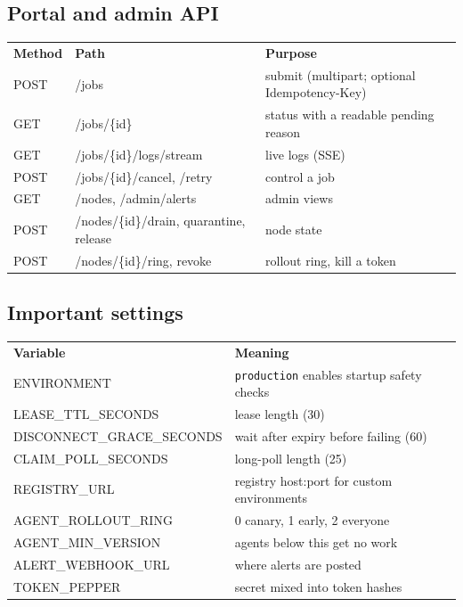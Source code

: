 \subsection{Portal and admin API}

\begin{center}
\begin{tabular}{lll}
\textbf{Method} & \textbf{Path} & \textbf{Purpose} \\
POST & /jobs & submit (multipart; optional Idempotency-Key) \\
GET & /jobs/\{id\} & status with a readable pending reason \\
GET & /jobs/\{id\}/logs/stream & live logs (SSE) \\
POST & /jobs/\{id\}/cancel, /retry & control a job \\
GET & /nodes, /admin/alerts & admin views \\
POST & /nodes/\{id\}/drain, quarantine, release & node state \\
POST & /nodes/\{id\}/ring, revoke & rollout ring, kill a token \\
\end{tabular}
\end{center}

\subsection{Important settings}

\begin{center}
\begin{tabular}{ll}
\textbf{Variable} & \textbf{Meaning} \\
ENVIRONMENT & \texttt{production} enables startup safety checks \\
LEASE\_TTL\_SECONDS & lease length (30) \\
DISCONNECT\_GRACE\_SECONDS & wait after expiry before failing (60) \\
CLAIM\_POLL\_SECONDS & long-poll length (25) \\
REGISTRY\_URL & registry host:port for custom environments \\
AGENT\_ROLLOUT\_RING & 0 canary, 1 early, 2 everyone \\
AGENT\_MIN\_VERSION & agents below this get no work \\
ALERT\_WEBHOOK\_URL & where alerts are posted \\
TOKEN\_PEPPER & secret mixed into token hashes \\
\end{tabular}
\end{center}

